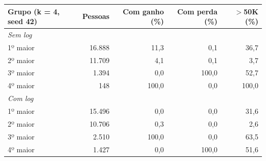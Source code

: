 \begin{tabular}{lrrrr}
\toprule
Grupo (k = 4, seed 42) & Pessoas & Com ganho (\%) & Com perda (\%) & $>$50K (\%) \\
\midrule
\multicolumn{5}{l}{\emph{Sem log}} \\
1º maior & 16.888 & 11,3 & 0,1 & 36,7 \\
2º maior & 11.709 & 4,1 & 0,1 & 3,7 \\
3º maior & 1.394 & 0,0 & 100,0 & 52,7 \\
4º maior & 148 & 100,0 & 0,0 & 100,0 \\
\midrule
\multicolumn{5}{l}{\emph{Com log}} \\
1º maior & 15.496 & 0,0 & 0,0 & 31,6 \\
2º maior & 10.706 & 0,3 & 0,0 & 2,6 \\
3º maior & 2.510 & 100,0 & 0,0 & 63,5 \\
4º maior & 1.427 & 0,0 & 100,0 & 51,6 \\
\bottomrule
\end{tabular}
